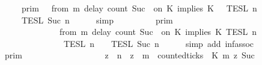 \begin{isabellebody}
\ \ \ \ \ \ {\isacharequal}\ {\isasymlbrakk}{\isasymlbrakk}\ {\isasymGamma}\ {\isasymrbrakk}{\isasymrbrakk}\isactrlsub p\isactrlsub r\isactrlsub i\isactrlsub m\ {\isasyminter}\ {\isasymlbrakk}{\isasymlbrakk}\ {\isacharparenleft}from\ m\ delay\ count\ {\isacharparenleft}Suc\ {}{\isacharparenright}\ on\ K\ implies\ K\ {\isacharhash}\ {\isasymPsi}\ {\isasymrbrakk}{\isasymrbrakk}\isactrlsub T\isactrlsub E\isactrlsub S\isactrlsub L\isactrlbsup {\isasymge}\ n\isactrlesup \isanewline
\ \ \ \ \ \ {\isasyminter}\ {\isasymlbrakk}{\isasymlbrakk}\ {\isasymPhi}\ {\isasymrbrakk}{\isasymrbrakk}\isactrlsub T\isactrlsub E\isactrlsub S\isactrlsub L\isactrlbsup {\isasymge}\ Suc\ n\isactrlesup {\isacartoucheclose}\isanewline
\ \ \ \ \isamarkupfalse%
\ simp\isanewline
\ \ \isamarkupfalse%
\ \isamarkupfalse%
\ {\isacartoucheopen}{\isachardot}{\isachardot}{\isachardot}\ {\isacharequal}\ {\isasymlbrakk}{\isasymlbrakk}\ {\isasymGamma}\ {\isasymrbrakk}{\isasymrbrakk}\isactrlsub p\isactrlsub r\isactrlsub i\isactrlsub m\ \isanewline
\ \ \ \ \ \ \ \ \ \ \ \ \ \ \ \ {\isasyminter}\ {\isasymlbrakk}\ {\isacharparenleft}from\ m\ delay\ count\ {\isacharparenleft}Suc\ {}{\isacharparenright}\ on\ K\ implies\ K\ {\isasymrbrakk}\isactrlsub T\isactrlsub E\isactrlsub S\isactrlsub L\isactrlbsup {\isasymge}\ n\isactrlesup \isanewline
\ \ \ \ \ \ \ \ \ \ \ \ \ \ \ \ {\isasyminter}\ {\isasymlbrakk}{\isasymlbrakk}\ {\isasymPsi}\ {\isasymrbrakk}{\isasymrbrakk}\isactrlsub T\isactrlsub E\isactrlsub S\isactrlsub L\isactrlbsup {\isasymge}\ n\isactrlesup \ {\isasyminter}\ {\isasymlbrakk}{\isasymlbrakk}\ {\isasymPhi}\ {\isasymrbrakk}{\isasymrbrakk}\isactrlsub T\isactrlsub E\isactrlsub S\isactrlsub L\isactrlbsup {\isasymge}\ Suc\ n\isactrlesup {\isacartoucheclose}\isanewline
\ \ \ \ \isamarkupfalse%
\ {\isacharparenleft}simp\ add{\isacharcolon}\ inf{\isachardot}assoc{\isacharparenright}\isanewline
\ \ \isamarkupfalse%
\ \isamarkupfalse%
\ {\isacartoucheopen}{\isachardot}{\isachardot}{\isachardot}\ {\isacharequal}\ {\isasymlbrakk}{\isasymlbrakk}\ {\isasymGamma}\ {\isasymrbrakk}{\isasymrbrakk}\isactrlsub p\isactrlsub r\isactrlsub i\isactrlsub m\ \isanewline
\ \ \ \ \ \ \ \ \ \ \ \ \ \ \ \ {\isasyminter}\ {\isacharbraceleft}{\isasymrho}{\isachardot}\ {\isasymforall}z\ {\isasymge}\ n{\isachardot}\ \ {\isacharparenleft}z\ {\isasymge}\ m\ {\isasymand}\ counted{\isacharunderscore}ticks\ {\isasymrho}\ K\ m\ z\ {\isacharparenleft}Suc\ {}{\isacharparenright}{\isacharparenright}\isanewline

\end{isabellebody}
